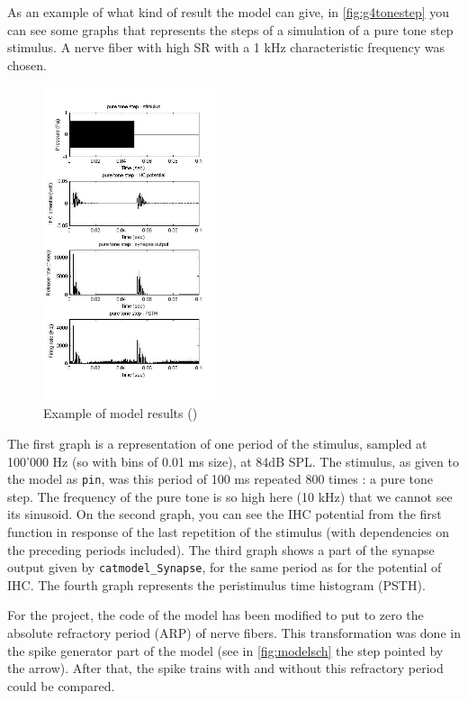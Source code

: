 As an example of what kind of result the model can give,
in \autoref{fig:g4tonestep} you can see some graphs that represents the steps of a 
simulation of a pure tone step stimulus.
A nerve fiber with high SR with a 1 kHz characteristic frequency 
was chosen.


\begin{figure}[h]
	\centering
	\includegraphics[width=0.45\textwidth]{images/g4-tonestep-column3.jpg}
	\caption{Example of model results (\cite{Model1})}
	\label{fig:g4tonestep}
\end{figure}

The first graph is a representation of one period of the stimulus, 
sampled at 100'000 Hz (so with bins of 0.01 ms size), at 84dB SPL.
The stimulus, as given to the model as \texttt{pin}, was this period of 100 ms repeated 800
times : a pure tone step. 
The frequency of the pure tone is so high here (10 kHz) that we cannot see its sinusoid.
On the second graph, you can see the IHC potential from the first function
in response of the last repetition of the stimulus 
(with dependencies on the preceding periods included).
The third graph shows a part of the synapse output given by \texttt{catmodel\_Synapse}, 
for the same period as for the potential of IHC.
The fourth graph represents the peristimulus time histogram (PSTH).

For the project, the code of the model has been modified to put to zero 
the absolute refractory period (ARP) of nerve fibers. 
This transformation was done in the spike generator 
part of the model (see in \autoref{fig:modelsch} the step pointed by the arrow).
After that, the spike trains with and without this refractory period could be compared.

